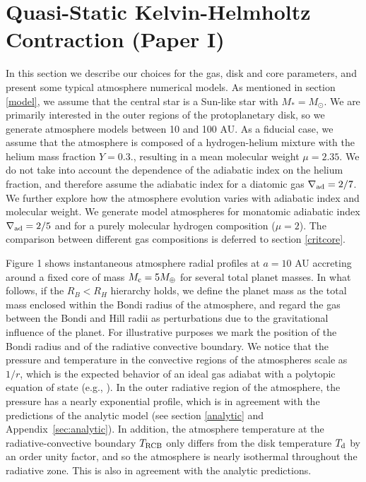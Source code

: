 \documentclass[apj]{emulateapj}
\newcommand{\delad}{\nabla_{\rm ad}}
\newcommand{\App}[1]{Appendix~\ref{#1}}
\begin{document}
\section{Quasi-Static Kelvin-Helmholtz Contraction \textbf{(Paper I)}}
\label{KH}

In this section we describe our choices for the gas, disk and core parameters, and present some typical atmosphere numerical models. As mentioned in section \ref{model}, we assume that the central star is a Sun-like star with $M_*=M_{\odot}$. We are primarily interested in the outer regions of the protoplanetary disk, so we generate atmosphere models between 10 and 100 AU. As a fiducial case, we assume that the atmosphere is composed of a hydrogen-helium mixture with the helium mass fraction $Y=0.3$., resulting in a mean molecular weight $\mu=2.35$. We do not take into account the dependence of the adiabatic index on the helium fraction, and therefore assume the adiabatic index for a diatomic gas $\delad=2/7$. We further explore how the atmosphere evolution varies with adiabatic index and molecular weight. We generate model atmospheres for monatomic adiabatic index $\delad=2/5$ and for a purely molecular hydrogen composition ($\mu=2$). The comparison between different gas compositions is deferred to section \ref{critcore}.

Figure 1 shows instantaneous atmosphere radial profiles at $a=10$ AU accreting around a fixed core of mass $M_{\rm{c}}=5 M_{\oplus}$ for several total planet masses. In what follows,  if the $R_B<R_H$ hierarchy holds, we define the planet mass as the total mass enclosed within the Bondi radius of the atmosphere, and regard the gas between the Bondi and Hill radii as perturbations due to the gravitational influence of the planet. For illustrative purposes we mark the position of the Bondi radius and of the radiative convective boundary. We notice that the pressure and temperature in the convective regions of the atmospheres scale as $1/r$, which is the expected behavior of an ideal gas adiabat with a polytopic equation of state (e.g., \citealt{rafikov06}). In the outer radiative region of the atmosphere, the pressure has a nearly exponential profile, which is in agreement with the predictions of the analytic model (see section \ref{analytic} and \App{sec:analytic}). In addition, the atmosphere temperature at the radiative-convective boundary $T_{\rm{RCB}}$ only differs from the disk temperature $T_{\rm{d}}$ by an order unity factor, and so the atmosphere is nearly isothermal throughout the radiative zone. This is also in agreement with the analytic predictions. %
\end{document}
